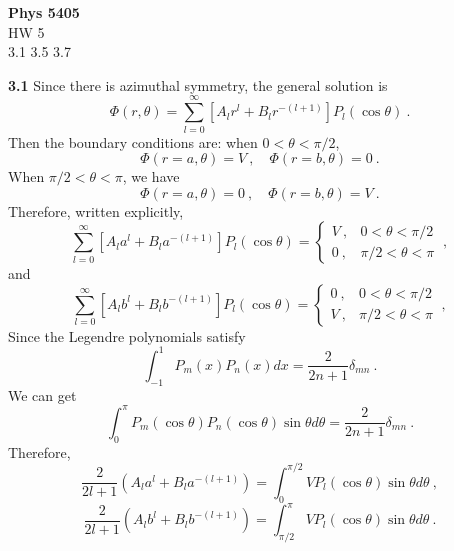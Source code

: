 \documentclass[12pt]{article}
\begin{document}
\begin{center}
{\bf Phys 5405}\\
HW 5 \\
3.1 3.5 3.7
\end{center}
{\bf 3.1}
Since there is azimuthal symmetry, the general solution is
\begin{equation}
    \Phi(r, \theta) = \sum_{l = 0}^\infty [A_l r^l + B_l r^{-(l+1)}] P_l(\cos \theta)~.
\end{equation}
Then the boundary conditions are: when $0 < \theta < \pi/2$,
\begin{equation}
    \Phi(r = a, \theta) = V~, \quad \Phi(r=b, \theta) = 0~.
\end{equation}
When $\pi/2 < \theta < \pi$, we have
\begin{equation}
    \Phi(r = a, \theta) = 0~, \quad \Phi(r=b, \theta) = V~.
\end{equation}
Therefore, written explicitly,
\begin{equation}\nonumber
    \sum_{l=0}^\infty [A_l a^l + B_l a^{-(l+1)}] P_l (\cos \theta) = \begin{cases}
        V~, & 0 < \theta < \pi/2\\
        0~, & \pi/2 < \theta < \pi
    \end{cases}~,
\end{equation}
and
\begin{equation}
    \sum_{l=0}^\infty [A_l b^l + B_l b^{-(l+1)}] P_l (\cos \theta) = \begin{cases}
        0~, & 0 < \theta < \pi/2\\
        V~, & \pi/2 < \theta < \pi
    \end{cases}~,
\end{equation}
Since the Legendre polynomials satisfy
\begin{equation}
    \int_{-1}^{1} P_m(x)P_n(x) dx = \frac{2}{2n + 1} \delta_{mn}~.
\end{equation}
We can get
\begin{equation}
    \int_0^\pi P_m(\cos \theta) P_n(\cos \theta) \sin \theta d\theta  = \frac{2}{2n+1} \delta_{mn}~.
\end{equation}
Therefore,
\begin{equation}
    \frac{2}{2l+1} (A_l a^l + B_l a^{-(l+1)})
    = \int_0^{\pi/2} V P_l(\cos\theta) \sin\theta d \theta~,
\end{equation}
\begin{equation}
    \frac{2}{2l+1} (A_l b^l + B_l b^{-(l+1)}) = \int_{\pi/2}^\pi V P_l(\cos \theta) \sin\theta d \theta~.
\end{equation}
\end{document}
